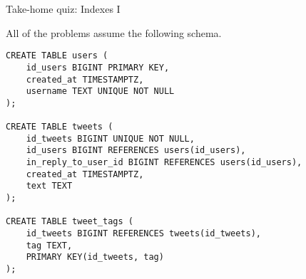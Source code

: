 \documentclass[12pt]{exam}
\theoremstyle{definition}
\begin{document}
\begin{center}
    {
\Large
    Take-home quiz: Indexes I
}
\end{center}



\noindent
All of the problems assume the following schema.
\begin{lstlisting}
CREATE TABLE users (
    id_users BIGINT PRIMARY KEY,
    created_at TIMESTAMPTZ,
    username TEXT UNIQUE NOT NULL
);

CREATE TABLE tweets (
    id_tweets BIGINT UNIQUE NOT NULL,
    id_users BIGINT REFERENCES users(id_users),
    in_reply_to_user_id BIGINT REFERENCES users(id_users),
    created_at TIMESTAMPTZ,
    text TEXT
);

CREATE TABLE tweet_tags (
    id_tweets BIGINT REFERENCES tweets(id_tweets),
    tag TEXT,
    PRIMARY KEY(id_tweets, tag)
);
\end{lstlisting}
\end{document}
